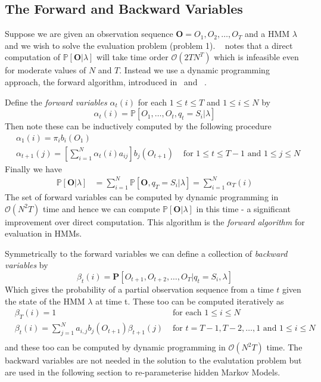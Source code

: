 \subsection{The Forward and Backward Variables}
Suppose we are given an observation sequence $\bm{O} = O_1,O_2,\dots,O_T$ and a HMM $\lambda$ and we wish to solve the evaluation problem (problem 1). ~\citet{rabiner1989tutorial} notes that a direct computation of $\mathbb{P}[\bm{O}|\lambda]$ will take time order $\mathcal{O}(2TN^T)$ which is infeasible even for moderate values of $N$ and $T$. Instead we use a dynamic programming approach, the forward algorithm, introduced in~\citet{baum1968growth} and ~\cite{baum1970maximization}.

Define the \emph{forward variables} $\alpha_t(i)$ for each $1\leq t \leq T$ and $1 \leq i \leq N$ by
\begin{equation*}
\alpha_t(i) = \mathbb{P}[O_1, \dots, O_t, q_t=S_i | \lambda]
\end{equation*}
Then note these can be inductively computed by the following procedure 
\begin{align*}
&\alpha_1(i) = \pi_ib_i(O_1)\\
&\alpha_{t+1}(j) = \left[ \sum_{i=1}^{N} \alpha_{t}(i)a_{ij} \right]b_j(O_{t+1}) &\text{ for $1\leq t \leq T-1$ and $1 \leq j \leq N$}
\end{align*}
Finally we have
\begin{align*}
\mathbb{P}[\bm{O} | \lambda] &= \sum_{i=1}^N \mathbb{P}[\bm{O}, q_T = S_i | \lambda] = \sum_{i=1}^N \alpha_T(i)
\end{align*}
The set of forward variables can be computed by dynamic programming in $\mathcal{O}(N^2T)$ time and hence we can compute $\mathbb{P}[\bm{O} | \lambda]$ in this time -  a significant improvement over direct computation. This algorithm is the \emph{forward algorithm} for evaluation in HMMs. 

Symmetrically to the forward variables we can define a collection of \emph{backward variables} by
\begin{equation*}
\beta_t(i) = \mathbf{P}[O_{t+1}, O_{t+2}, \dots, O_T | q_t = S_i, \lambda]
\end{equation*}
Which gives the probability of a partial observation sequence from a time $t$ given the state of the HMM $\lambda$ at time t. These too can be computed iteratively as
\begin{align*}
&\beta_T(i) = 1 &\text{ for each } 1 \leq i \leq N \\
&\beta_t(i)  = \sum_{j=1}^N a_{i,j}b_j(O_{t+1})\beta_{t+1}(j) &\text{ for } t = T-1, T-2,\dots,1 \text{ and } 1 \leq i \leq N \\
\end{align*}
and these too can be computed by dynamic programming in $\mathcal{O}(N^2T)$ time. The backward variables are not needed in the solution to the evalutation problem but are used in the following section to re-parameterise hidden Markov Models. 

